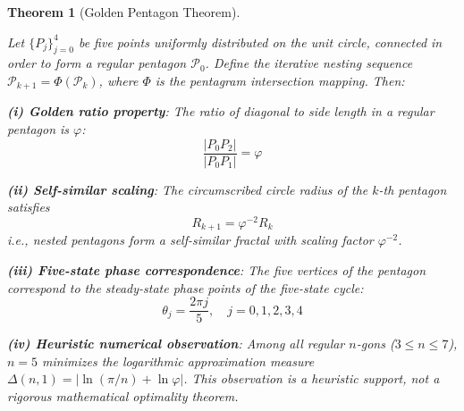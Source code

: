 \documentclass[12pt,a4paper,twocolumn]{article}
\renewcommand{\phi}{\varphi}
\newtheorem{theorem}{Theorem}[section]
\begin{document}
\begin{theorem}[Golden Pentagon Theorem]
\label{thm:golden_pentagon}

Let $\{P_j\}_{j=0}^4$ be five points uniformly distributed on the unit circle, connected in order to form a regular pentagon $\mathcal{P}_0$. Define the iterative nesting sequence $\mathcal{P}_{k+1} = \Phi(\mathcal{P}_k)$, where $\Phi$ is the pentagram intersection mapping. Then:

\textbf{(i) Golden ratio property}: The ratio of diagonal to side length in a regular pentagon is $\phi$:
\begin{equation}
\frac{|P_0P_2|}{|P_0P_1|} = \phi
\end{equation}

\textbf{(ii) Self-similar scaling}: The circumscribed circle radius of the $k$-th pentagon satisfies
\begin{equation}
R_{k+1} = \phi^{-2} R_k
\end{equation}
i.e., nested pentagons form a self-similar fractal with scaling factor $\phi^{-2}$.

\textbf{(iii) Five-state phase correspondence}: The five vertices of the pentagon correspond to the steady-state phase points of the five-state cycle:
\begin{equation}
\theta_j = \frac{2\pi j}{5}, \quad j=0,1,2,3,4
\end{equation}

\textbf{(iv) Heuristic numerical observation}: Among all regular $n$-gons ($3 \le n \le 7$), $n=5$ minimizes the logarithmic approximation measure $\Delta(n,1) = |\ln(\pi/n) + \ln\phi|$. This observation is a heuristic support, not a rigorous mathematical optimality theorem.
\end{theorem}
\end{document}
